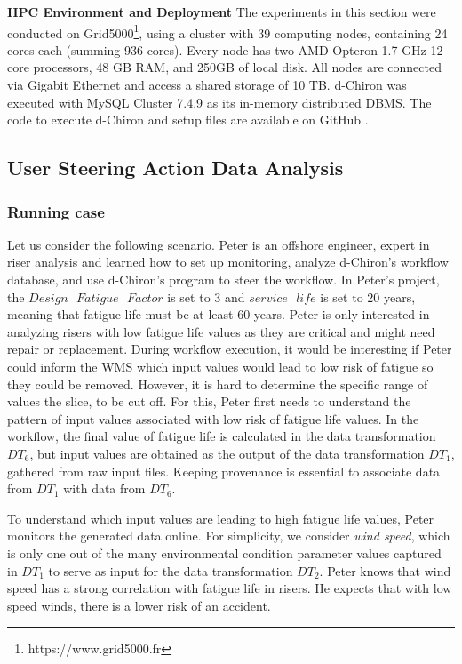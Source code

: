 \textbf{HPC Environment and Deployment}
The experiments in this section were conducted on Grid5000\footnote{https://www.grid5000.fr}, using a
cluster with 39 computing nodes, containing 24 cores each (summing 936 cores).
Every node has two AMD Opteron 1.7 GHz 12-core processors, 48 GB RAM, and
250GB of local disk. All nodes are connected via Gigabit Ethernet and
access a shared storage of 10 TB.
d-Chiron was executed with MySQL Cluster 7.4.9 as its in-memory distributed DBMS. The code to execute d-Chiron and setup files are available on GitHub \cite{d-ChironGitHub}.




\subsection{User Steering Action Data Analysis}
\label{sec_exp_rfa_data_reduction_analysis}

\subsubsection{Running case}

Let us consider the following scenario. Peter is an offshore engineer,
expert in riser analysis and learned how to set up monitoring, analyze
d-Chiron's workflow database, and use d-Chiron's  program to steer the workflow.
In Peter's project, the $Design \text{ } Fatigue \text{ } Factor$ is set to 3 and $service \text{ }
life$ is set to 20 years, meaning that fatigue life must be at least 60
years. Peter is only interested in analyzing risers with low fatigue
life values as they are critical and might need repair or
replacement. During workflow execution, it would be interesting if Peter
could inform the WMS which input values would lead to low risk of
fatigue so they could be removed. However, it is hard to determine the specific range of values \ie{} the
slice, to be cut off. For this, Peter first needs to understand the
pattern of input values associated with low risk of fatigue life values.
In the workflow, the final value of fatigue life is calculated in the
data transformation $DT_6$, but input values are obtained as the output of
the data transformation $DT_1$, gathered from raw input files. Keeping provenance is essential to
associate data from $DT_1$ with data from $DT_6$.

To understand which input values are leading to high fatigue life
values, Peter monitors the generated data online. For simplicity, we
consider \textit{wind speed}, which is only one out of the many
environmental condition parameter values captured in $DT_1$ to serve
as input for the data transformation $DT_2$.
 Peter knows that wind speed has a strong
correlation with fatigue life in risers. He expects that with low speed
winds, there is a lower risk of an accident.


